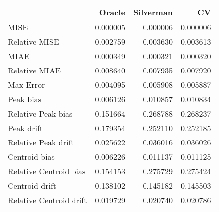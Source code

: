 \begin{tabular}{lrrr}
  \hline
 & Oracle & Silverman & CV \\ 
  \hline
MISE & 0.000005 & 0.000006 & 0.000006 \\ 
  Relative MISE & 0.002759 & 0.003630 & 0.003613 \\ 
  MIAE & 0.000349 & 0.000321 & 0.000320 \\ 
  Relative MIAE & 0.008640 & 0.007935 & 0.007920 \\ 
  Max Error & 0.004095 & 0.005908 & 0.005887 \\ 
  Peak bias & 0.006126 & 0.010857 & 0.010834 \\ 
  Relative Peak bias & 0.151664 & 0.268788 & 0.268237 \\ 
  Peak drift & 0.179354 & 0.252110 & 0.252185 \\ 
  Relative Peak drift & 0.025622 & 0.036016 & 0.036026 \\ 
  Centroid bias & 0.006226 & 0.011137 & 0.011125 \\ 
  Relative Centroid bias & 0.154153 & 0.275729 & 0.275424 \\ 
  Centroid drift & 0.138102 & 0.145182 & 0.145503 \\ 
  Relative Centroid drift & 0.019729 & 0.020740 & 0.020786 \\ 
   \hline
\end{tabular}
